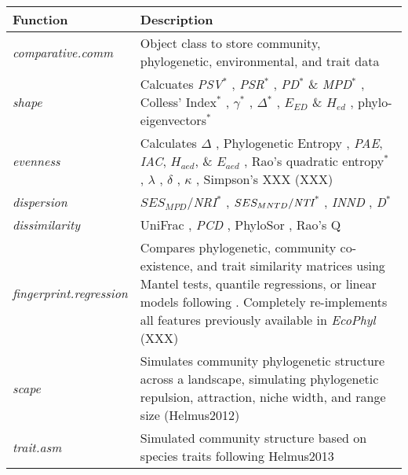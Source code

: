 \documentclass[11pt]{article} %
\begin{document}
\begin{table}
\begin{center}
\begin{tabular}{p{3.5cm} p{14cm}}
  Function & Description\\\hline
  \emph{comparative.comm} & Object class to store community, phylogenetic, environmental, and trait data\\
  \emph{shape} & Calcuates \emph{PSV}$^*$ \autocite{Helmus2007}, \emph{PSR}$^*$ \autocite{Helmus2007}, \emph{PD}$^*$ \& \emph{MPD}$^*$ \autocite{Faith1992}, Colless' Index$^*$ \autocite{Colless1982}, $\gamma$$^*$ \autocite{Pybus2000}, $\Delta$$^*$ \autocite{Warwick1995}, $E_{ED}$ \& $H_{ed}$ \autocite{Cadotte2010}, phylo-eigenvectors$^*$ \autocite{Diniz-Filho2011}\\
  \emph{evenness} & Calculates $\Delta$ \autocite{Warwick1995}, Phylogenetic Entropy \autocite{Allen2009}, \emph{PAE}, \emph{IAC}, $H_{aed}$, \& $E_{aed}$ \autocite{Cadotte2010}, Rao's quadratic entropy$^*$ \autocite{Rao1982a}, $\lambda$ \autocite{Pagel1999}, $\delta$ \autocite{Pagel1999}, $\kappa$ \autocite{Pagel1999}, Simpson's XXX (XXX)\\
  \emph{dispersion} & $SES_{MPD}$/\emph{NRI}$^*$ \autocite{Webb2000,Webb2002,Kembel2009}, $SES_{MNTD}/\emph{NTI}$$^*$ \autocite{Webb2000,Webb2002,Kembel2009}, \emph{INND} \autocite{Ness2011}, \emph{D}$^*$ \autocite{Fritz2010}\\
\emph{dissimilarity} &  UniFrac \autocite{Lozupone2005}, \emph{PCD} \autocite{Helmus2010}, PhyloSor \autocite{Bryant2008}, Rao's Q \autocite{Rao1982a}\\
  \emph{fingerprint.regression} & Compares phylogenetic, community co-existence, and trait similarity matrices using Mantel tests, quantile regressions, or linear models following \autocite{Cavender-Bares2004,Cavender-Bares2006}. Completely re-implements all features previously available in \emph{EcoPhyl} (XXX) \\
  \emph{scape} & Simulates community phylogenetic structure across a landscape, simulating phylogenetic repulsion, attraction, niche width, and range size (Helmus2012)\\ %

  \emph{trait.asm} & Simulated community structure based on species traits following Helmus2013\\ %


\end{tabular}
\end{center}
\end{table}
\end{document}
